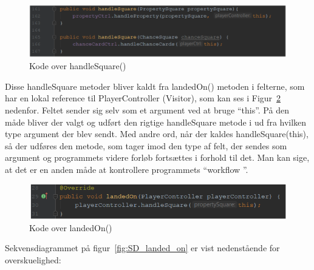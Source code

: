 \documentclass[class=article, crop=false]{standalone}
\begin{document}
        \begin{figure}[H]
        \centering
        \includegraphics[scale=0.5]{pics/handle_square.png}
        \caption{Kode over handleSquare()}\label{fig:handle_square}
    \end{figure}
        Disse handleSquare metoder bliver kaldt fra landedOn() metoden i felterne, som har en lokal reference til PlayerController (Visitor), som kan ses i Figur~\ref{fig:landed_on} nedenfor. Feltet sender sig selv som et argument ved at bruge “this”. På den måde bliver der valgt og udført den rigtige handleSquare metode i ud fra hvilken type argument der blev sendt. Med andre ord, når der kaldes handleSquare(this), så der udføres den metode, som tager imod den type af felt, der sendes som argument og programmets videre forløb fortsættes i forhold til det. Man kan sige, at det er en anden måde at kontrollere programmets “workflow ”.
        \begin{figure}[H]
            \centering
            \includegraphics[scale=0.6]{pics/landed_on.PNG}
            \caption{Kode over landedOn()}\label{fig:landed_on}
        \end{figure}

        Sekvensdiagrammet på figur~\ref{fig:SD_landed_on} er vist nedenstående for overskuelighed:
\end{document}
